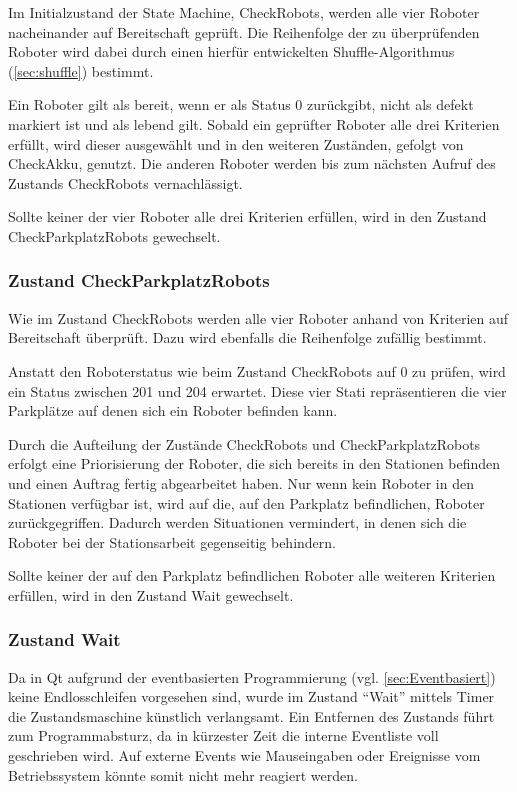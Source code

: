 Im Initialzustand der State Machine, CheckRobots, werden alle vier Roboter nacheinander auf Bereitschaft geprüft. Die Reihenfolge der zu überprüfenden Roboter wird dabei durch einen hierfür entwickelten Shuffle-Algorithmus (\ref{sec:shuffle}) bestimmt. 

Ein Roboter gilt als bereit, wenn er als Status 0 zurückgibt, nicht als defekt markiert ist und als lebend gilt. Sobald ein geprüfter Roboter alle drei Kriterien erfüllt, wird dieser ausgewählt und in den weiteren Zuständen, gefolgt von CheckAkku, genutzt. Die anderen Roboter werden bis zum nächsten Aufruf des Zustands CheckRobots vernachlässigt.

Sollte keiner der vier Roboter alle drei Kriterien erfüllen, wird in den Zustand CheckParkplatzRobots gewechselt.

\subsubsection{Zustand CheckParkplatzRobots}

Wie im Zustand CheckRobots werden alle vier Roboter anhand von Kriterien auf Bereitschaft überprüft. Dazu wird ebenfalls die Reihenfolge zufällig bestimmt.

Anstatt den Roboterstatus wie beim Zustand CheckRobots auf 0 zu prüfen, wird ein Status zwischen 201 und 204 erwartet. Diese vier Stati repräsentieren die vier Parkplätze auf denen sich ein Roboter befinden kann. 

Durch die Aufteilung der Zustände CheckRobots und CheckParkplatzRobots erfolgt eine Priorisierung der Roboter, die sich bereits in den Stationen befinden und einen Auftrag fertig abgearbeitet haben. Nur wenn kein Roboter in den Stationen verfügbar ist, wird auf die, auf den Parkplatz befindlichen, Roboter zurückgegriffen. Dadurch werden Situationen vermindert, in denen sich die Roboter bei der Stationsarbeit gegenseitig behindern.

Sollte keiner der auf den Parkplatz befindlichen Roboter alle weiteren Kriterien erfüllen, wird in den Zustand Wait gewechselt.

\subsubsection{Zustand Wait}

Da in Qt aufgrund der eventbasierten Programmierung (vgl. \ref{sec:Eventbasiert}) keine Endlosschleifen vorgesehen sind, wurde im Zustand "`Wait"' mittels Timer die Zustandsmaschine künstlich verlangsamt. Ein Entfernen des Zustands führt zum Programmabsturz, da in kürzester Zeit die interne Eventliste voll geschrieben wird. Auf externe Events wie Mauseingaben oder Ereignisse vom Betriebssystem könnte somit nicht mehr reagiert werden. 

